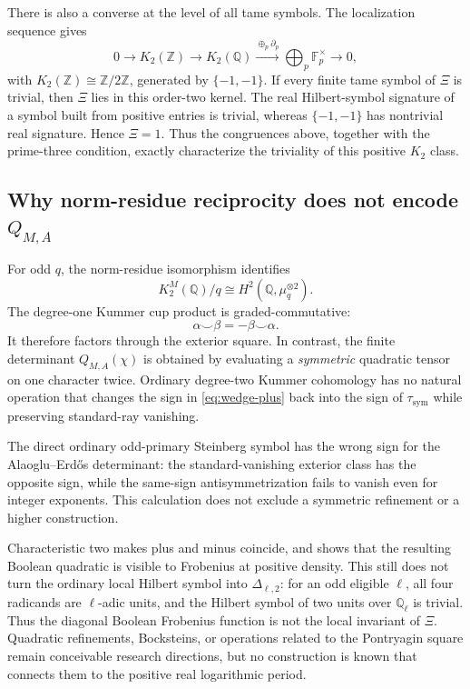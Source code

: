 \documentclass[11pt]{article}
\numberwithin{equation}{section}
\theoremstyle{definition}
\theoremstyle{remark}
\newcommand{\Q}{\mathbb Q}
\newcommand{\Z}{\mathbb Z}
\newcommand{\F}{\mathbb F}
\begin{document}
There is also a converse at the level of all tame symbols.  The localization sequence \cite{WeibelK} gives
\begin{equation}
 0\longrightarrow K_2(\Z)\longrightarrow K_2(\Q)
 \xrightarrow{\oplus_p\partial_p}
 \bigoplus_p\F_p^\times\longrightarrow0,\label{eq:localization}
\end{equation}
with \(K_2(\Z)\cong\Z/2\Z\), generated by \(\{-1,-1\}\).  If every finite tame symbol of
\(\Xi\) is trivial, then \(\Xi\) lies in this order-two kernel.  The real Hilbert-symbol
signature of a symbol built from positive entries is trivial, whereas \(\{-1,-1\}\) has
nontrivial real signature.  Hence \(\Xi=1\).  Thus the congruences above, together with the
prime-three condition, exactly characterize the triviality of this positive \(K_2\) class.

\subsection{Why norm-residue reciprocity does not encode \texorpdfstring{\(Q_{M,A}\)}{Q(M,A)}}

For odd \(q\), the norm-residue isomorphism identifies
\[
 K_2^M(\Q)/q\cong H^2(\Q,\mu_q^{\otimes2}).
\]
The degree-one Kummer cup product is graded-commutative:
\[
 \alpha\smile\beta=-\beta\smile\alpha.
\]
It therefore factors through the exterior square.  In contrast, the finite determinant
\(Q_{M,A}(\chi)\) is obtained by evaluating a \emph{symmetric} quadratic tensor on one
character twice.  Ordinary degree-two Kummer cohomology has no natural operation that
changes the sign in \eqref{eq:wedge-plus} back into the sign of
\(\tau_{\mathrm{sym}}\) while preserving standard-ray vanishing.

\begin{resultbox}
The direct ordinary odd-primary Steinberg symbol has the wrong sign for the
Alaoglu--Erd\H{o}s determinant: the standard-vanishing exterior class has the opposite
sign, while the same-sign antisymmetrization fails to vanish even for integer exponents.
This calculation does not exclude a symmetric refinement or a higher construction.
\end{resultbox}

Characteristic two makes plus and minus coincide, and  shows that the
resulting Boolean quadratic is visible to Frobenius at positive density.  This still does not
turn the ordinary local Hilbert symbol into \(\Delta_{\ell,2}\): for an odd eligible
\(\ell\), all four radicands are \(\ell\)-adic units, and the Hilbert symbol of two units
over \(\Q_\ell\) is trivial.  Thus the diagonal Boolean Frobenius function is not the local
invariant of \(\Xi\).  Quadratic refinements, Bocksteins, or operations related to the
Pontryagin square remain conceivable research directions, but no construction is known that
connects them to the positive real logarithmic period.
\end{document}
